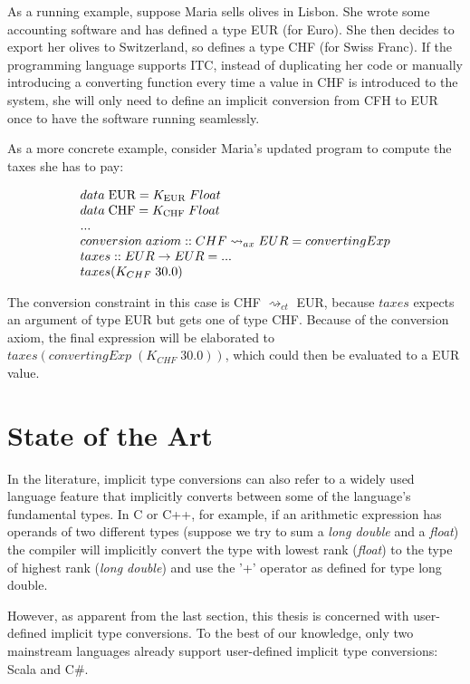  As a running example, suppose Maria sells olives in Lisbon. She wrote some accounting software and has defined a type EUR (for Euro). She then decides to export her olives to Switzerland, so defines a type CHF (for Swiss Franc). If the programming language supports ITC, instead of duplicating her code or manually introducing a converting function every time a value in CHF is introduced to the system, she will only need to define an implicit conversion from CFH to EUR once to have the software running seamlessly.

 As a more concrete example, consider Maria's updated program to compute the taxes she has to pay:

     \[
\begin{array}{@{\hspace{0mm}}l@{\hspace{0mm}}}
data\;\text{EUR}=K_{\text{EUR}}\;Float\\
data\;\text{CHF}=K_{\text{CHF}}\;Float\\
...\\
conversion\;axiom:: CHF \rightsquigarrow_{ax} EUR = convertingExp \\
taxes :: EUR \to EUR = ...\\
taxes (K_{CHF} \; 30.0)
\end{array}
\]

The conversion constraint in this case is CHF $\rightsquigarrow_{ct}$ EUR, because $taxes$ expects an argument of type EUR but gets one of type CHF. Because of the conversion axiom, the final expression will be elaborated to $taxes (convertingExp\;(K_{CHF} \; 30.0))$, which could then be evaluated to a EUR value.

\section{State of the Art}
\label{sota}
In the literature, implicit type conversions can also refer to a widely used language feature that implicitly converts between some of the language's fundamental types. In C or C++, for example, if an arithmetic expression has operands of two different types (suppose we try to sum a \textit{long double} and a \textit{float}) the compiler will implicitly convert the type with lowest rank (\textit{float}) to the type of highest rank (\textit{long double}) and use the '+' operator as defined for type long double.

However, as apparent from the last section, this thesis is concerned with user-defined implicit type conversions. To the best of our knowledge, only two mainstream languages already support user-defined implicit type conversions: Scala and C\#.
